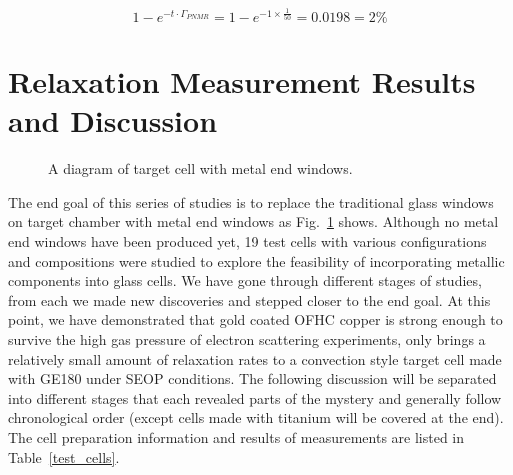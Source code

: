 \begin{equation}
1-e^{-t\cdot \Gamma_{PNMR}} = 1-e^{-1\times \frac{1}{50}} =0.0198=2\%
\end{equation}

\section{Relaxation Measurement Results and Discussion}

\begin{figure}[t!]
	\centering
	\caption{{A diagram of target cell with metal end windows. }}
	\label{metal_end_windows}
\end{figure}

The end goal of this series of studies is to replace the traditional glass windows on target chamber with metal end windows as Fig.~\ref{metal_end_windows} shows. Although no metal end windows have been produced yet, 19 test cells with various configurations and compositions were studied to explore the feasibility of incorporating metallic components into glass cells. We have gone through different stages of studies, from each we made new discoveries and stepped closer to the end goal. At this point, we have demonstrated that gold coated OFHC copper is strong enough to survive the high gas pressure of electron scattering experiments, only brings a relatively small amount of relaxation rates to a convection style target cell made with GE180 under SEOP conditions. The following discussion will be separated into different stages that each revealed parts of the mystery and generally follow chronological order (except cells made with titanium will be covered at the end). The cell preparation information and results of measurements are listed in Table~\ref{test_cells}.

